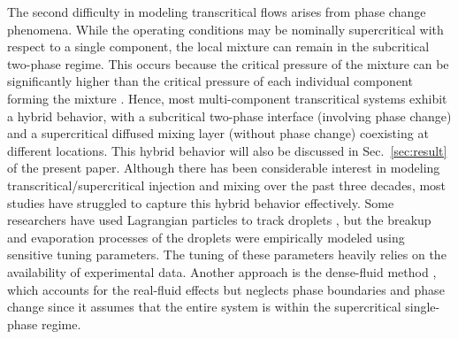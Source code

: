 

The second difficulty in modeling transcritical flows arises from phase change phenomena. While the operating conditions may be nominally supercritical with respect to a single component, the local mixture can remain in the subcritical two-phase regime. This occurs because the critical pressure of the mixture can be significantly higher than the critical pressure of each individual component forming the mixture \cite{van1980critical,tudisco2020numerical,zhang2022multicomponent}. Hence, most multi-component transcritical systems exhibit a hybrid behavior, with a subcritical two-phase interface (involving phase change) and a supercritical diffused mixing layer (without phase change) coexisting at different locations. This hybrid behavior will also be discussed in Sec.~\ref{sec:result} of the present paper. Although there has been considerable interest in modeling transcritical/supercritical injection and mixing over the past three decades, most studies have struggled to capture this hybrid behavior effectively. Some researchers have used Lagrangian particles to track droplets \cite{pei2015large,kahila2018large,gadalla2020large}, but the breakup and evaporation processes of the droplets were empirically modeled using sensitive tuning parameters. The tuning of these parameters heavily relies on the availability of experimental data. Another approach is the dense-fluid method \cite{yang2000modeling,lacaze2015analysis,jofre2021transcritical}, which accounts for the real-fluid effects but neglects phase boundaries and phase change since it assumes that the entire system is within the supercritical single-phase regime. 
